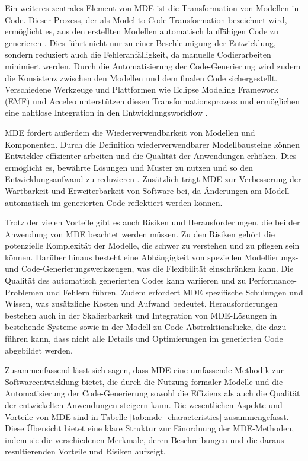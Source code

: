 Ein weiteres zentrales Element von MDE ist die Transformation von Modellen in Code. Dieser Prozess, der als 
Model-to-Code-Transformation bezeichnet wird, ermöglicht es, aus den erstellten Modellen automatisch lauffähigen 
Code zu generieren \cite{brambilla2017model}. Dies führt nicht nur zu einer Beschleunigung der Entwicklung, sondern 
reduziert auch die Fehleranfälligkeit, da manuelle Codierarbeiten minimiert werden. Durch die Automatisierung der 
Code-Generierung wird zudem die Konsistenz zwischen den Modellen und dem finalen Code sichergestellt. Verschiedene 
Werkzeuge und Plattformen wie Eclipse Modeling Framework (EMF) und Acceleo unterstützen diesen Transformationsprozess 
und ermöglichen eine nahtlose Integration in den Entwicklungsworkflow \cite{steinberg2008emf}.

MDE fördert außerdem die Wiederverwendbarkeit von Modellen und Komponenten. Durch die Definition wiederverwendbarer 
Modellbausteine können Entwickler effizienter arbeiten und die Qualität der Anwendungen erhöhen. Dies ermöglicht es, 
bewährte Lösungen und Muster zu nutzen und so den Entwicklungsaufwand zu reduzieren \cite{France_2007}. Zusätzlich 
trägt MDE zur Verbesserung der Wartbarkeit und Erweiterbarkeit von Software bei, da Änderungen am Modell automatisch 
im generierten Code reflektiert werden können.

Trotz der vielen Vorteile gibt es auch Risiken und Herausforderungen, die bei der Anwendung von MDE beachtet werden 
müssen. Zu den Risiken gehört die potenzielle Komplexität der Modelle, die schwer zu verstehen und zu pflegen sein 
können. Darüber hinaus besteht eine Abhängigkeit von speziellen Modellierungs- und Code-Generierungswerkzeugen, was 
die Flexibilität einschränken kann. Die Qualität des automatisch generierten Codes kann variieren und zu 
Performance-Problemen und Fehlern führen. Zudem erfordert MDE spezifische Schulungen und Wissen, was zusätzliche
Kosten und Aufwand bedeutet. Herausforderungen bestehen auch in der Skalierbarkeit und Integration von MDE-Lösungen 
in bestehende Systeme sowie in der Modell-zu-Code-Abstraktionslücke, die dazu führen kann, dass nicht alle Details 
und Optimierungen im generierten Code abgebildet werden.

Zusammenfassend lässt sich sagen, dass MDE eine umfassende Methodik zur Softwareentwicklung bietet, die durch 
die Nutzung formaler Modelle und die Automatisierung der Code-Generierung sowohl die Effizienz als auch die 
Qualität der entwickelten Anwendungen steigern kann. Die wesentlichen Aspekte und Vorteile von MDE sind 
in Tabelle \ref{tab:mde_characteristics} zusammengefasst. Diese Übersicht bietet eine klare Struktur zur 
Einordnung der MDE-Methoden, indem sie die verschiedenen Merkmale, deren Beschreibungen und die daraus 
resultierenden Vorteile und Risiken aufzeigt.

